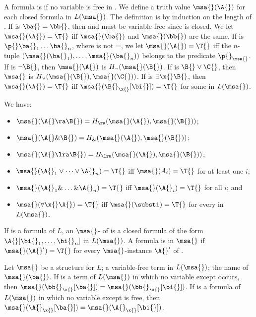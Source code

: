 A formula \A{} is  if no variable is free in \A{}.
We define a truth value $\msa{}(\A{})$ for each closed formula \A{} in $L(\msa{})$.
The definition is by induction on the length of \A{}.
If \A{} is $\ba{} = \bb{}$, then \ba{} and \bb{} must be variable-free since \A{} is closed.
We let $\msa{}(\A{}) = \T{}$ iff $\msa{}(\ba{})$ and $\msa{}(\bb{})$ are the same.
If \A{} is $\p{} \ba{}_1 \dots \ba{}_n$, where \p{} is not =, we let $\msa{}(\A{}) = \T{}$ iff the $n$-tuple $(\msa{}(\ba{}_1), \dots, \msa{} (\ba{}_n))$ belongs to the predicate $\p{}_\msa{}$.
If \A{} is $\neg \B{}$, then $\msa{}(\A{})$ is $H_\neg (\msa{}(\B{})$.
If \A{} is $\B{} \vee \C{}$, then $\msa{}$ is $H_\vee (\msa{}(\B{}), \msa{}(\C{}))$.
If \A{} is $\exists \x{} \B{}$, then $\msa{} (\A{}) = \T{}$ iff $\msa{} (\B{}_\x{} [\bi{}]) = \T{}$ for some \bi{} in $L(\msa{})$.

We have:
\begin{itemize}
    \item $\msa{} (\A{} \ra \B{}) = H_\ra (\msa{}(\A{}), \msa{}(\B{}))$;
    \item $\msa{}(\A{} \& \B{}) = H_\& (\msa{}(\A{}), \msa{}(\B{}))$;
    \item $\msa{}(\A{} \lra \B{}) = H_\lra (\msa{}(\A{}), \msa{}(\B{}))$;
    \item $\msa{}(\A{}_1 \vee \dots \vee \A{}_n) = \T{}$ iff $\msa{}(A{}_i) = \T{}$ for at least one $i$;
    \item $\msa{}(\A{}_1 \& \dots \& \A{}_n) = \T{}$ iff $\msa{}(\A{}_i) = \T{}$ for all $i$; and
    \item $\msa{}(\forall \x{} \A{}) = \T{}$ iff $\msa{} (\substi) = \T{}$ for every \bi{} in $L(\msa{})$.
\end{itemize}

If \A{} is a formula of $L$, an $\msa{}$- of \A{} is a closed formula of the form $\A{}[\bi{}_1, \dots, \bi{}_n]$ in $L(\msa{})$.
A formula is  in $\msa{}$ if $\msa{} (\A{}') = \T{}$ for every $\msa{}$-instance $\A{}'$ of \A{}.

\begin{lemma}\label{substitution lemma}
    Let $\msa{}$ be a structure for $L$;
    \ba{} a variable-free term in $L(\msa{})$;
    \bi{} the name of $\msa{}(\ba{})$.
    If \bb{} is a term of $L(\msa{})$ in which no variable except \x{} occurs, then $\msa{} (\bb{}_\x{}[\ba{}]) = \msa{} (\bb{}_\x{}[\bi{}])$.
    If \A{} is a formula of $L(\msa{})$ in which no variable except \x{} is free, then $\msa{} (\A{}_\x{}[\ba{}]) = \msa{} (\A{}_\x{}[\bi{}])$.
\end{lemma}

